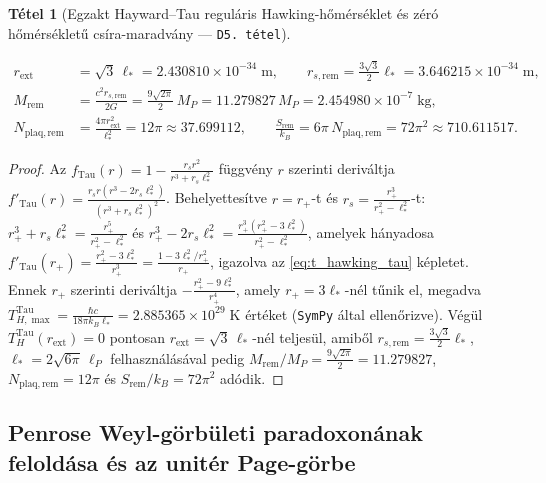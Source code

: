 \documentclass[11pt,a4paper]{article}
\newtheorem{theorem}{T\'etel}[section]
\theoremstyle{remark}
\begin{document}
\begin{theorem}[Egzakt Hayward--Tau regul\'aris Hawking-h\H{o}m\'ers\'eklet \'es z\'er\'o h\H{o}m\'ers\'eklet\H{u} cs\'ira-maradv\'any --- \texttt{D5.\ t\'etel}]
\begin{enumerate}
  \begin{align}
    r_{\mathrm{ext}} &= \sqrt{3}\,\ell_* = 2.430810 \times 10^{-34}\;\mathrm{m}, \qquad
    r_{s,\mathrm{rem}} = \frac{3\sqrt{3}}{2}\ell_* = 3.646215 \times 10^{-34}\;\mathrm{m}, \nonumber\\
    M_{\mathrm{rem}} &= \frac{c^2 r_{s,\mathrm{rem}}}{2G} = \frac{9\sqrt{2\pi}}{2}\,M_P = 11.279827\,M_P = 2.454980 \times 10^{-7}\;\mathrm{kg}, \nonumber\\
    N_{\mathrm{plaq,rem}} &= \frac{4\pi r_{\mathrm{ext}}^2}{\ell_*^2} = 12\pi \approx 37.699112, \qquad
    \frac{S_{\mathrm{rem}}}{k_B} = 6\pi\,N_{\mathrm{plaq,rem}} = 72\pi^2 \approx 710.611517.
    \label{eq:extremal_remnant}
  \end{align}
\end{enumerate}
\end{theorem}

\begin{proof}
Az $f_{\mathrm{Tau}}(r) = 1 - \frac{r_s r^2}{r^3 + r_s\ell_*^2}$ f\"uggv\'eny $r$ szerinti deriv\'altja $f'_{\mathrm{Tau}}(r) = \frac{r_s r(r^3 - 2r_s\ell_*^2)}{(r^3 + r_s\ell_*^2)^2}$. Behelyettes\'itve $r = r_+$-t \'es $r_s = \frac{r_+^3}{r_+^2 - \ell_*^2}$-t: $r_+^3 + r_s\ell_*^2 = \frac{r_+^5}{r_+^2 - \ell_*^2}$ \'es $r_+^3 - 2r_s\ell_*^2 = \frac{r_+^3(r_+^2 - 3\ell_*^2)}{r_+^2 - \ell_*^2}$, amelyek h\'anyadosa $f'_{\mathrm{Tau}}(r_+) = \frac{r_+^2 - 3\ell_*^2}{r_+^3} = \frac{1 - 3\ell_*^2/r_+^2}{r_+}$, igazolva az \eqref{eq:t_hawking_tau} k\'epletet. Ennek $r_+$ szerinti deriv\'altja $-\frac{r_+^2 - 9\ell_*^2}{r_+^4}$, amely $r_+ = 3\ell_*$-n\'el t\H{u}nik el, megadva $T_{H,\max}^{\mathrm{Tau}} = \frac{\hbar c}{18\pi k_B\ell_*} = 2.885365 \times 10^{29}\;\mathrm{K}$ \'ert\'eket (\texttt{SymPy} \'altal ellen\H{o}rizve). V\'eg\"ul $T_H^{\mathrm{Tau}}(r_{\mathrm{ext}}) = 0$ pontosan $r_{\mathrm{ext}} = \sqrt{3}\,\ell_*$-n\'el teljes\"ul, amib\H{o}l $r_{s,\mathrm{rem}} = \frac{3\sqrt{3}}{2}\ell_*$, $\ell_* = 2\sqrt{6\pi}\,\ell_P$ felhaszn\'al\'as\'aval pedig $M_{\mathrm{rem}}/M_P = \frac{9\sqrt{2\pi}}{2} = 11.279827$, $N_{\mathrm{plaq,rem}} = 12\pi$ \'es $S_{\mathrm{rem}}/k_B = 72\pi^2$ ad\'odik.
\end{proof}

\subsection{Penrose Weyl-g\"orb\"uleti paradoxon\'anak felold\'asa \'es az unit\'er Page-g\"orbe}
\end{document}
